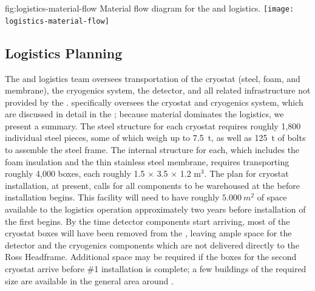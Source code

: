  
\begin{dunefigure}{fig:logistics-material-flow}
  {Material flow diagram for the  and  logistics.}
 \texttt{[image: logistics-material-flow]}
\end{dunefigure}

\subsection{Logistics Planning}
\label{sec:fdsp-tc-logPln}

The  and  logistics team oversees transportation of the cryostat (steel, foam, and membrane), the cryogenics system, the detector, and all related infrastructure not provided by the . 
 specifically oversees the cryostat and cryogenics system, which are  discussed in detail in the  ; because  material dominates the logistics, we present a summary.  
The steel structure for each cryostat requires roughly 1,800 individual steel pieces,  some of which weigh up to \SI{7.5}{t}, as well as \SI{125}{t} of bolts to assemble the steel frame. 
The internal structure for each, which includes the foam insulation and the thin stainless steel membrane, requires transporting roughly 4,000 boxes, 
 each roughly 1.5 $\times$ 3.5 $\times$ 1.2 m$^3$. 
 The plan for cryostat installation, at present, calls for all components to be warehoused at the  before installation begins. 
This facility will need to have roughly $\SI{5,000}{m^2}$ of space available to the logistics operation approximately two years before installation of the first  begins. 
By the time detector components start arriving, most of the cryostat boxes will have been removed from the , leaving ample space for the detector and the cryogenics components which are not delivered directly to the Ross Headframe. 
Additional space may be required if the boxes for the second cryostat arrive before   \#1 installation is complete; a few buildings of the required size are available in the general area around . 

